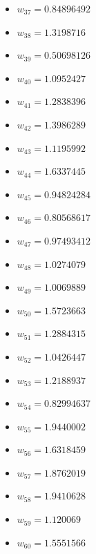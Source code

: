 \documentclass[11pt]{article}
\begin{document}
\begin{itemize}
\item $w_{37} = 0.84896492$
\item $w_{38} = 1.3198716$
\item $w_{39} = 0.50698126$
\item $w_{40} = 1.0952427$
\item $w_{41} = 1.2838396$
\item $w_{42} = 1.3986289$
\item $w_{43} = 1.1195992$
\item $w_{44} = 1.6337445$
\item $w_{45} = 0.94824284$
\item $w_{46} = 0.80568617$
\item $w_{47} = 0.97493412$
\item $w_{48} = 1.0274079$
\item $w_{49} = 1.0069889$
\item $w_{50} = 1.5723663$
\item $w_{51} = 1.2884315$
\item $w_{52} = 1.0426447$
\item $w_{53} = 1.2188937$
\item $w_{54} = 0.82994637$
\item $w_{55} = 1.9440002$
\item $w_{56} = 1.6318459$
\item $w_{57} = 1.8762019$
\item $w_{58} = 1.9410628$
\item $w_{59} = 1.120069$
\item $w_{60} = 1.5551566$
\end{itemize}
\end{document}
